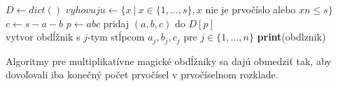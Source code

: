 \begin{algorithmic}
\STATE $D \gets dict()$
\STATE $vyhovuju \gets \{x ~|~ x \in \{1, \dots , s\}, x$ nie je prvočíslo alebo $xn \leq s\}$
	\STATE $c \gets s-a-b$
		\STATE $p \gets abc$
		\STATE pridaj $(a,b,c)$ do $D[p]$ \\
	\ENDIF
\ENDFOR
{}
				\STATE vytvor obdĺžnik s $j$-tym stĺpcom $a_{j}, b_{j}, c_{j}$ pre $j \in \{1, \dots , n\}$
					\STATE \textbf{print}(obdlznik)
				\ENDIF
			\ENDFOR
		\ENDIF
	\ENDFOR
\ENDFOR
\end{algorithmic}

\begin{note} Algoritmy pre multiplikatívne magické obdĺžniky sa dajú obmedziť tak, aby dovoľovali iba konečný počet prvočísel v prvočíselnom rozklade.
\end{note} 

